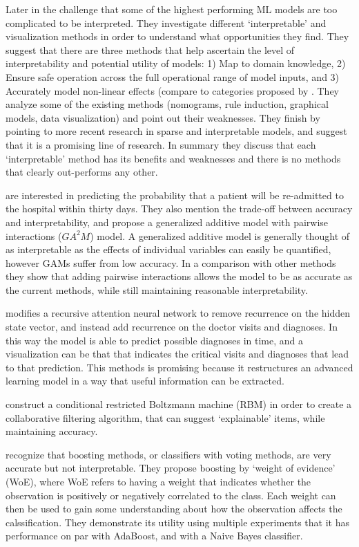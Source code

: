     Later in \citet{Van_Belle2013-ph} the challenge that some of the highest performing ML models are too complicated to be interpreted. They investigate different `interpretable' and visualization methods in order to understand what opportunities they find. They suggest that there are three methods that help ascertain the level of interpretability and potential utility of models: 1) Map to domain knowledge, 2) Ensure safe operation across the full operational range of model inputs, and 3) Accurately model non-linear effects (compare to categories proposed by \citet{Lipton2016-ug}. They analyze some of the existing methods (nomograms, rule induction, graphical models, data visualization) and point out their weaknesses. They finish by pointing to more recent research in sparse and interpretable models, and suggest that it is a promising line of research. In summary they discuss that each `interpretable' method has its benefits and weaknesses and there is no methods that clearly out-performs any other.

    \citet{Caruana2015-za} are interested in predicting the probability that a patient will be re-admitted to the hospital within thirty days. They also mention the trade-off between accuracy and interpretability, and propose a generalized additive model with pairwise interactions ($GA^2M$) model. A generalized additive model is generally thought of as interpretable as the effects of individual variables can easily be quantified, however GAMs suffer from low accuracy. In a comparison with other methods they show that adding pairwise interactions allows the model to be as accurate as the current methods, while still maintaining reasonable interpretability.

    \citet{Choi2016-by} modifies a recursive attention neural network to remove recurrence on the hidden state vector, and instead add recurrence on the doctor visits and diagnoses. In this way the model is able to predict possible diagnoses in time, and a visualization can be that that indicates the critical visits and diagnoses that lead to that prediction. This methods is promising because it restructures an advanced learning model in a way that useful information can be extracted.

    \citet{Abdollahi2016-vn} construct a conditional restricted Boltzmann machine (RBM) in order to create a collaborative filtering algorithm, that can suggest `explainable' items, while maintaining accuracy. 

    \citet{Ridgeway1998-lv} recognize that boosting methods, or classifiers with voting methods, are very accurate but not interpretable. They propose boosting by `weight of evidence' (WoE), where WoE refers to having a weight that indicates whether the observation is positively or negatively correlated to the class. Each weight can then be used to gain some understanding about how the observation affects the calssification. They demonstrate its utility using multiple experiments that it has performance on par with AdaBoost, and with a Naive Bayes classifier. 

